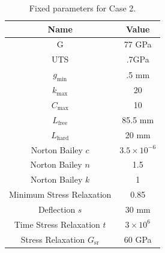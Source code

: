 \documentclass[10pt]{article}
\begin{document}
\vspace{-.4in}
	 \begin{table}[H]
	 \caption{Fixed parameters for Case 2.}
	 \centering 
	 	\begin{tabular}{c  c}
		\hline \hline 
	 	 Name & Value\\
		\hline
	 	 G & 77 GPa \\
		 UTS & .7GPa \\
		 $g_{\text{min}}$ & .5 mm\\ 
	 	 $k_{\text{max}}$ & 20\\
		 $C_{\text{max}}$ & 10\\
		 $L_{\text{free}}$ & 85.5 mm\\
		 $L_{\text{hard}}$ & 20 mm\\
		 Norton Bailey $c$& $ 3.5 \times 10^{-6}$ \\
		 Norton Bailey $n$ & 1.5\\
		 Norton Bailey $k$ & 1 \\
		 Minimum Stress Relaxation & 0.85\\
		 Deflection $s$ & 30 mm\\
		 Time Stress Relaxation $t$  & $3 \times 10^{6}$\\
		 Stress Relaxation $G_{\text{sr}}$ & 60 GPa\\
		\hline \hline
	 \end{tabular}
	 \end{table}
\end{document}
